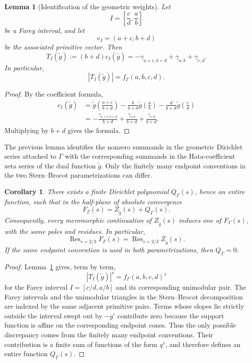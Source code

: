 \documentclass[a4paper,american,11pt]{amsart}
\theoremstyle{plain}
\newtheorem{lemma}[theorem]{Lemma}
\newtheorem{corollary}[theorem]{Corollary}
\theoremstyle{definition}
\DeclareMathOperator*{\Res}{Res}
\begin{document}
\begin{lemma}[Identification of the geometric weights]
\label{lem:dual-identification}
Let
\[
I=\left[\frac cd,\frac ab\right]
\]
be a Farey interval, and let
\[
v_I=(a+c,b+d)
\]
be the associated primitive vector. Then
\[
T_I(\widetilde g)
:=
(b+d)c_I(\widetilde g)
=
-\gamma_{a+c,b+d}+\gamma_{a,b}+\gamma_{c,d}.
\]
In particular,
\[
|T_I(\widetilde g)|=f_\Gamma(a,b,c,d).
\]
\end{lemma}

\begin{proof}
By the coefficient formula,
\begin{align*}
c_I(\widetilde g)
&=
\widetilde g\!\left(\frac{a+c}{b+d}\right)
-\frac{b}{b+d}\widetilde g\!\left(\frac ab\right)
-\frac{d}{b+d}\widetilde g\!\left(\frac cd\right) \\
&=
-\frac{\gamma_{a+c,b+d}}{b+d}
+\frac{\gamma_{a,b}}{b+d}
+\frac{\gamma_{c,d}}{b+d}.
\end{align*}
Multiplying by \(b+d\) gives the formula.
\end{proof}

The previous lemma identifies the nonzero summands in the geometric
Dirichlet series attached to \(\Gamma\) with the corresponding summands in
the Hata-coefficient zeta series of the dual function \(\widetilde g\).
Only the finitely many endpoint conventions in the two Stern--Brocot
parametrizations can differ.

\begin{corollary}
\label{cor:Fgamma-is-Zg}
There exists a finite Dirichlet polynomial \(Q_\Gamma(s)\), hence an entire
function, such that in the half-plane of absolute convergence
\[
F_\Gamma(s)
=
Z_{\widetilde g}(s)+Q_\Gamma(s).
\]
Consequently, every meromorphic continuation of
\(Z_{\widetilde g}(s)\) induces one of \(F_\Gamma(s)\), with the same poles
and residues. In particular,
\[
\Res_{s=2/3}F_\Gamma(s)
=
\Res_{s=2/3}Z_{\widetilde g}(s).
\]
If the same endpoint convention is used in both parametrizations, then
\(Q_\Gamma=0\).
\end{corollary}

\begin{proof}
Lemma~\ref{lem:dual-identification} gives, term by term,
\[
|T_I(\widetilde g)|^s
=
f_\Gamma(a,b,c,d)^s
\]
for the Farey interval \(I=[c/d,a/b]\) and its corresponding unimodular
pair. The Farey intervals and the unimodular triangles in the
Stern--Brocot decomposition are indexed by the same adjacent primitive
pairs. Terms whose slopes lie strictly outside the interval swept out by
\(-g'\) contribute zero because the support function is affine on the
corresponding endpoint cones. Thus the only possible discrepancy comes
from the finitely many endpoint conventions. Their contribution is a
finite sum of functions of the form \(q^s\), and therefore defines an
entire function \(Q_\Gamma(s)\).
\end{proof}
\end{document}
